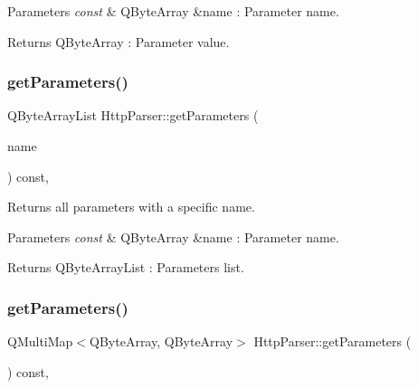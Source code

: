 \begin{DoxyParams}{Parameters}
{\em const} & Q\+Byte\+Array \&name \+: Parameter name. \\
\hline
\end{DoxyParams}
\begin{DoxyReturn}{Returns}
Q\+Byte\+Array \+: Parameter value. 
\end{DoxyReturn}
\mbox{\label{class_http_parser_aa0df65d83e9bdb39a6a667d55de1b742}} 
\subsubsection{\texorpdfstring{get\+Parameters()}{getParameters()}\hspace{0.1cm}{\footnotesize\ttfamily [1/2]}}
{\footnotesize\ttfamily Q\+Byte\+Array\+List Http\+Parser\+::get\+Parameters (\begin{DoxyParamCaption}\item[{const Q\+Byte\+Array \&}]{name }\end{DoxyParamCaption}) const\hspace{0.3cm}{\ttfamily [inline]}, {\ttfamily [noexcept]}}



Returns all parameters with a specific name. 


\begin{DoxyParams}{Parameters}
{\em const} & Q\+Byte\+Array \&name \+: Parameter name. \\
\hline
\end{DoxyParams}
\begin{DoxyReturn}{Returns}
Q\+Byte\+Array\+List \+: Parameters list. 
\end{DoxyReturn}
\mbox{\label{class_http_parser_a98e85a16d456f61fa032c8d3d9a8c1ba}} 
\subsubsection{\texorpdfstring{get\+Parameters()}{getParameters()}\hspace{0.1cm}{\footnotesize\ttfamily [2/2]}}
{\footnotesize\ttfamily Q\+Multi\+Map$<$Q\+Byte\+Array, Q\+Byte\+Array$>$ Http\+Parser\+::get\+Parameters (\begin{DoxyParamCaption}{ }\end{DoxyParamCaption}) const\hspace{0.3cm}{\ttfamily [inline]}, {\ttfamily [noexcept]}}



